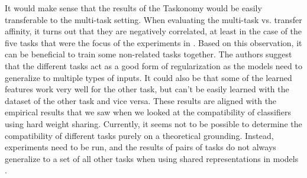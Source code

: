 It would make sense that the results of the Taskonomy would be easily transferable to the multi-task setting.
When evaluating the multi-task vs. transfer affinity, it turns out that they are negatively correlated, at least in the case of the five tasks that were the focus of the experiments in \citep{whichTasks}.
Based on this observation, it can be beneficial to train some non-related tasks together.
The authors suggest that the different tasks act as a good form of regularization as the models need to generalize to multiple types of inputs.
It could also be that some of the learned features work very well for the other task, but can't be easily learned with the dataset of the other task and vice versa.
These results are aligned with the empirical results that we saw when we looked at the compatibility of classifiers using hard weight sharing.
Currently, it seems not to be possible to determine the compatibility of different tasks purely on a theoretical grounding.
Instead, experiments need to be run, and the results of pairs of tasks do not always generalize to a set of all other tasks when using shared representations in models \citep{visualPerson}.
